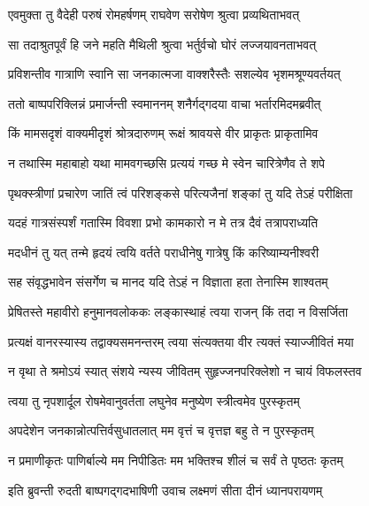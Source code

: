 
\twolineshloka
{एवमुक्ता तु वैदेही परुषं रोमहर्षणम्}
{राघवेण सरोषेण श्रुत्वा प्रव्यथिताभवत्} %

\twolineshloka
{सा तदाश्रुतपूर्वं हि जने महति मैथिली}
{श्रुत्वा भर्तुर्वचो घोरं लज्जयावनताभवत्} %

\twolineshloka
{प्रविशन्तीव गात्राणि स्वानि सा जनकात्मजा}
{वाक्शरैस्तैः सशल्येव भृशमश्रूण्यवर्तयत्} %

\twolineshloka
{ततो बाष्पपरिक्लिन्नं प्रमार्जन्ती स्वमाननम्}
{शनैर्गद्गदया वाचा भर्तारमिदमब्रवीत्} %

\twolineshloka
{किं मामसदृशं वाक्यमीदृशं श्रोत्रदारुणम्}
{रूक्षं श्रावयसे वीर प्राकृतः प्राकृतामिव} %

\twolineshloka
{न तथास्मि महाबाहो यथा मामवगच्छसि}
{प्रत्ययं गच्छ मे स्वेन चारित्रेणैव ते शपे} %

\twolineshloka
{पृथक्स्त्रीणां प्रचारेण जातिं त्वं परिशङ्कसे}
{परित्यजैनां शङ्कां तु यदि तेऽहं परीक्षिता} %

\twolineshloka
{यदहं गात्रसंस्पर्शं गतास्मि विवशा प्रभो}
{कामकारो न मे तत्र दैवं तत्रापराध्यति} %

\twolineshloka
{मदधीनं तु यत् तन्मे हृदयं त्वयि वर्तते}
{पराधीनेषु गात्रेषु किं करिष्याम्यनीश्वरी} %

\twolineshloka
{सह संवृद्धभावेन संसर्गेण च मानद}
{यदि तेऽहं न विज्ञाता हता तेनास्मि शाश्वतम्} %

\twolineshloka
{प्रेषितस्ते महावीरो हनुमानवलोककः}
{लङ्कास्थाहं त्वया राजन् किं तदा न विसर्जिता} %

\twolineshloka
{प्रत्यक्षं वानरस्यास्य तद्वाक्यसमनन्तरम्}
{त्वया संत्यक्तया वीर त्यक्तं स्याज्जीवितं मया} %

\twolineshloka
{न वृथा ते श्रमोऽयं स्यात् संशये न्यस्य जीवितम्}
{सुहृज्जनपरिक्लेशो न चायं विफलस्तव} %

\twolineshloka
{त्वया तु नृपशार्दूल रोषमेवानुवर्तता}
{लघुनेव मनुष्येण स्त्रीत्वमेव पुरस्कृतम्} %

\twolineshloka
{अपदेशेन जनकान्नोत्पत्तिर्वसुधातलात्}
{मम वृत्तं च वृत्तज्ञ बहु ते न पुरस्कृतम्} %

\twolineshloka
{न प्रमाणीकृतः पाणिर्बाल्ये मम निपीडितः}
{मम भक्तिश्च शीलं च सर्वं ते पृष्ठतः कृतम्} %

\twolineshloka
{इति ब्रुवन्ती रुदती बाष्पगद्गदभाषिणी}
{उवाच लक्ष्मणं सीता दीनं ध्यानपरायणम्} %

